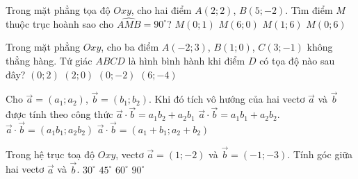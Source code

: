 \begin{ex}%
	Trong mặt phẳng tọa độ $Oxy$, cho hai điểm $A(2;2)$, $B(5;-2)$. Tìm điểm $M$ thuộc trục hoành sao cho $\widehat{AMB} = 90^\circ$?
	\choice
	{$M(0;1)$}
	{\True $M(6;0)$}
	{$M(1;6)$}
	{$M(0;6)$}
\end{ex}
\begin{ex}%
	Trong mặt phẳng $Oxy$, cho ba điểm $A(-2;3)$, $B(1;0)$, $C(3;-1)$ không thẳng hàng. Tứ giác $ABCD$ là hình bình hành khi điểm $D$ có tọa độ nào sau đây?
	\choice
	{\True $(0;2)$}
	{$(2;0)$}
	{$(0;-2)$}
	{$(6;-4)$}
\end{ex}
\begin{ex}
	Cho $\overrightarrow{a} = (a_1; a_2)$, $\overrightarrow{b} = (b_1; b_2)$. Khi đó tích vô hướng của hai vectơ $\overrightarrow{a}$ và $\overrightarrow{b}$ được tính theo công thức
	\choice
	{$\overrightarrow{a} \cdot \overrightarrow{b} = a_1b_2 + a_2b_1$}
	{\True $\overrightarrow{a} \cdot \overrightarrow{b} = a_1b_1 + a_2b_2$.}
	{$\overrightarrow{a} \cdot \overrightarrow{b} = (a_1b_1; a_2b_2)$}
	{$\overrightarrow{a} \cdot \overrightarrow{b} = (a_1+b_1; a_2+b_2)$}
\end{ex}

\begin{ex}%
	Trong hệ trục toạ độ $Oxy$, vectơ $\overrightarrow{a}=(1;-2)$ và $\overrightarrow{b}=(-1;-3)$. Tính góc giữa hai vectơ $\overrightarrow{a}$ và $\overrightarrow{b}$.
	\choice
	{$30^\circ $}
	{\True $45^\circ $}
	{$60^\circ $}
	{$90^\circ $}
\end{ex}

